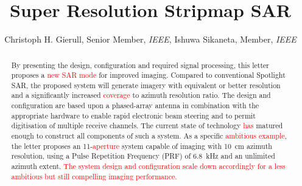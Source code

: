\documentclass[journal]{IEEEtran}
\title{Super Resolution Stripmap SAR}
\author{Christoph H. Gierull, Senior Member, \textsl{IEEE}, Ishuwa Sikaneta, \cg{Senior}  Member, \textsl{IEEE}}
\newcommand{\cg}[1]{\textcolor{red}{#1}}
\begin{document}
\maketitle


\begin{abstract}
By presenting the design, configuration and required signal processing, this letter proposes a \cg{new SAR mode} for improved imaging. Compared to conventional Spotlight SAR, the proposed system will generate imagery with equivalent or better resolution and a significantly increased \cg{coverage} to azimuth resolution ratio. The design and configuration are based upon a phased-array antenna in combination with the appropriate hardware to enable rapid electronic beam steering and to permit digitisation of multiple receive channels. The current state of technology \cg{has} matured enough to construct all components of such a system. As a specific \cg{ambitious example}, the letter proposes an 11-\cg{aperture} system capable of imaging with 10~cm azimuth resolution, using a Pulse Repetition Frequency (PRF) of 6.8~kHz and an unlimited azimuth extent. \cg{The system design and configuration scale down accordingly for a less ambitious but still compelling imaging performance.}  
\end{abstract}


\end{document}
